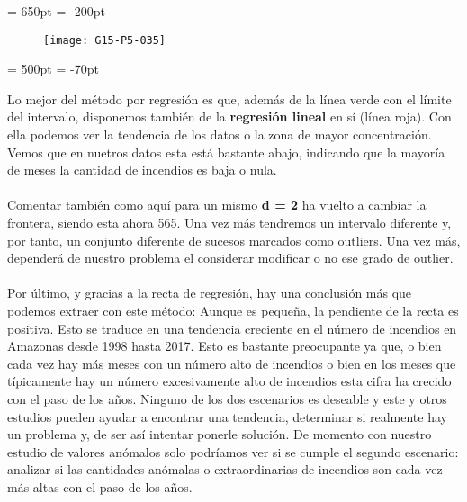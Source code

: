 \documentclass [a4paper] {article}
\begin{document}
\textwidth = 650pt
\hoffset = -200pt
\begin{figure}[h!]
\centering
\begin{Schunk}
\end{Schunk}
\texttt{[image: G15-P5-035]}
\end{figure}
\textwidth = 500pt
\hoffset = -70pt

Lo mejor del método por regresión es que, además de la línea verde con el límite del intervalo,
disponemos también de la \textbf{regresión lineal} en sí (línea roja). Con ella podemos ver la
tendencia de los datos o la zona de mayor concentración. Vemos que en nuetros datos esta está
bastante abajo, indicando que la mayoría de meses la cantidad de incendios es baja o nula.
\\\\
Comentar también como aquí para un mismo \textbf{d = 2} ha vuelto a cambiar la frontera, siendo
esta ahora 565. Una vez más tendremos un intervalo diferente y, por tanto, un conjunto diferente
de sucesos marcados como outliers. Una vez más, dependerá de nuestro problema el considerar
modificar o no ese grado de outlier.
\\\\
Por último, y gracias a la recta de regresión, hay una conclusión más que podemos extraer con
este método: Aunque es pequeña, la pendiente de la recta es positiva. Esto se traduce en una tendencia
creciente en el número de incendios en Amazonas desde 1998 hasta 2017. Esto es bastante
preocupante ya que, o bien cada vez hay más meses con un número alto de incendios o bien 
en los meses que típicamente hay un número excesivamente alto de incendios esta cifra ha crecido
con el paso de los años. Ninguno de los dos escenarios es deseable y este y otros estudios
pueden ayudar a encontrar una tendencia, determinar si realmente hay un problema y, de ser así
intentar ponerle solución. De momento con nuestro estudio de valores anómalos solo podríamos
ver si se cumple el segundo escenario: analizar si las cantidades anómalas o extraordinarias
de incendios son cada vez más altas con el paso de los años.
\end{document}
